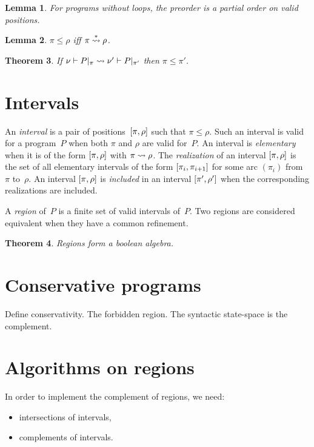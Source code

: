 \documentclass[a4paper]{article}
\theoremstyle{theorem}
\newtheorem{theorem}{Theorem}
\newtheorem{lemma}[theorem]{Lemma}
\theoremstyle{example}
\theoremstyle{remark}
\begin{document}
\begin{lemma}
  For programs without loops, the preorder is a partial order on valid
  positions.
\end{lemma}

\begin{lemma}
  $\pi\leq\rho$ iff $\pi\overset*\redto\rho$.
\end{lemma}

\begin{theorem}
  If $\penv\nu{\postate\pi P}\redto\penv{\nu'}{\postate{\pi'}P}$ then
  $\pi\leq\pi'$.
\end{theorem}

\section{Intervals}
An \emph{interval} is a pair of positions~$\intv\pi\rho$ such that
$\pi\leq\rho$. Such an interval is valid for a program~$P$ when both $\pi$ and
$\rho$ are valid for~$P$.  An interval is \emph{elementary} when it is of the
form $\intv\pi\rho$ with $\pi\redto\rho$. The \emph{realization} of an interval
$\intv\pi\rho$ is the set of all elementary intervals of the form
$\intv{\pi_i}{\pi_{i+1}}$ for some arc $(\pi_i)$ from~$\pi$ to~$\rho$.  An
interval $\intv\pi\rho$ is \emph{included} in an interval $\intv{\pi'}{\rho'}$
when the corresponding realizations are included.

A \emph{region} of~$P$ is a finite set of valid intervals of~$P$. Two regions
are considered equivalent when they have a common refinement.

\begin{theorem}
  Regions form a boolean algebra.
\end{theorem}

\section{Conservative programs}
Define conservativity. The forbidden region. The syntactic state-space is the
complement.

\section{Algorithms on regions}
In order to implement the complement of regions, we need:
\begin{itemize}
\item intersections of intervals,
\item complements of intervals.
\end{itemize}
\end{document}
